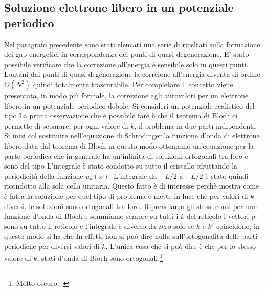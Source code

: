 \documentclass[a4paper,12pt]{article}
\begin{document}
\subsection{Soluzione elettrone libero in un potenziale periodico}
Nel paragrafo precedente sono stati elencati una serie di riusltati sulla formazione dei gap energetici in corrispondenza dei punti di quasi degenerazione. E' stato possibile verificare che la correzione all'energia è sensibile solo in questi punti. Lontani dai punti di quasi degenerazione la correione all'energia diventa di ordine $O(N^2)$ quindi totalmente trascurabile. Per completare il concetto viene presentata, in modo più formale, la correzione agli autovalori per un elettrone libero in un potenziale periodico debole. Si consideri un potenziale realistico del tipo
La prima osservazione che è possibile fare è che il teorema di Bloch ci permette di separare, per ogni valore di $k$, il problema in due parti indipendenti. Si inizi col sostituire nell'equazione di Schrodinger la funzione d'onda di elettrone libero data dal teorema di Bloch
in questo modo otteniamo un'equazione per la parte periodica
che in generale ha un'infinita di soluzioni ortogonali tra loro e sono del tipo
L'integrale è stato condotto su tutto il cristallo sfruttando la periodicità della funzione $u_k(x)$. L'integrale da $-L/2$ a $+L/2$ è stato quindi ricondotto alla sola cella unitaria.
Questo fatto è di interesse perchè mostra come è fatta la soluzione per quel tipo di problema e mette in luce che per valori di $k$ diversi, le soluzioni sono ortogonali tra loro. Riprendiamo gli stessi conti per una funzione d'onda di Bloch e sommiamo sempre su tutti i $k$ del reticolo
i vettori p sono su tutto il reticolo e l'integrale è diverso da zero solo se $k$ e $k'$ coincidono, in questo modo si ha che
In effetti non si può dire nulla sull'ortogonalità delle parti periodiche per diversi valori di $k$. L'unica cosa che si può dire è che per lo stesso valore di $k$, stati d'onda  di Bloch sono ortogonali.\footnote{Molto oscuro...}
\end{document}
